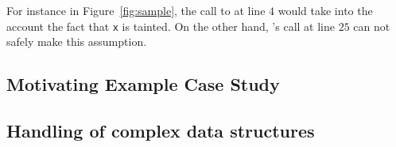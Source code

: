 For instance in Figure~\ref{fig:sample}, the call to \even{} at
line $4$ would take into the account the fact that \texttt{x}
is tainted.
On the other hand, \even{}'s call at line $25$ can not safely
make this assumption.

\subsection{Motivating Example Case Study}\label{sec:sampleSummary}

\subsection{Handling of complex data structures}
